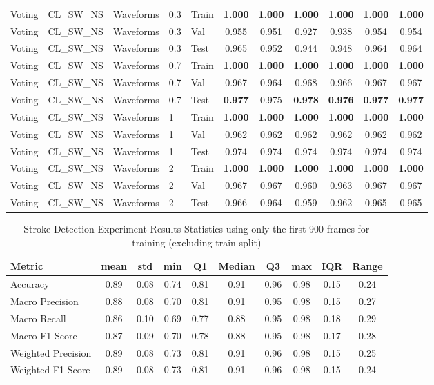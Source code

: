 \begin{landscape}
\begin{longtable}{|l|l|l|l|l|c|c|c|c|c|c|}
Voting & CL\_SW\_NS & Waveforms & 0.3 & Train & \textbf{1.000} & \textbf{1.000} & \textbf{1.000} & \textbf{1.000} & \textbf{1.000} & \textbf{1.000} \\
Voting & CL\_SW\_NS & Waveforms & 0.3 & Val & 0.955 & 0.951 & 0.927 & 0.938 & 0.954 & 0.954 \\
Voting & CL\_SW\_NS & Waveforms & 0.3 & Test & 0.965 & 0.952 & 0.944 & 0.948 & 0.964 & 0.964 \\
Voting & CL\_SW\_NS & Waveforms & 0.7 & Train & \textbf{1.000} & \textbf{1.000} & \textbf{1.000} & \textbf{1.000} & \textbf{1.000} & \textbf{1.000} \\
Voting & CL\_SW\_NS & Waveforms & 0.7 & Val & 0.967 & 0.964 & 0.968 & 0.966 & 0.967 & 0.967 \\
Voting & CL\_SW\_NS & Waveforms & 0.7 & Test & \textbf{0.977} & 0.975 & \textbf{0.978} & \textbf{0.976} & \textbf{0.977} & \textbf{0.977} \\
Voting & CL\_SW\_NS & Waveforms & 1 & Train & \textbf{1.000} & \textbf{1.000} & \textbf{1.000} & \textbf{1.000} & \textbf{1.000} & \textbf{1.000} \\
Voting & CL\_SW\_NS & Waveforms & 1 & Val & 0.962 & 0.962 & 0.962 & 0.962 & 0.962 & 0.962 \\
Voting & CL\_SW\_NS & Waveforms & 1 & Test & 0.974 & 0.974 & 0.974 & 0.974 & 0.974 & 0.974 \\
Voting & CL\_SW\_NS & Waveforms & 2 & Train & \textbf{1.000} & \textbf{1.000} & \textbf{1.000} & \textbf{1.000} & \textbf{1.000} & \textbf{1.000} \\
Voting & CL\_SW\_NS & Waveforms & 2 & Val & 0.967 & 0.967 & 0.960 & 0.963 & 0.967 & 0.967 \\
Voting & CL\_SW\_NS & Waveforms & 2 & Test & 0.966 & 0.964 & 0.959 & 0.962 & 0.965 & 0.965 \\
\end{longtable}
\end{landscape}

\begin{table}[h]
\caption{Stroke Detection Experiment Results Statistics using only the first 900 frames for training (excluding train split)}
\label{tab:_900_Stroke_Detection_Results_Statistics}
\begin{tabular}{|l|c|c|c|c|c|c|c|c|c|}
\toprule
Metric & mean & std & min & Q1 & Median & Q3 & max & IQR & Range \\
\midrule
Accuracy & 0.89 & 0.08 & 0.74 & 0.81 & 0.91 & 0.96 & 0.98 & 0.15 & 0.24 \\
Macro Precision & 0.88 & 0.08 & 0.70 & 0.81 & 0.91 & 0.95 & 0.98 & 0.15 & 0.27 \\
Macro Recall & 0.86 & 0.10 & 0.69 & 0.77 & 0.88 & 0.95 & 0.98 & 0.18 & 0.29 \\
Macro F1-Score & 0.87 & 0.09 & 0.70 & 0.78 & 0.88 & 0.95 & 0.98 & 0.17 & 0.28 \\
Weighted Precision & 0.89 & 0.08 & 0.73 & 0.81 & 0.91 & 0.96 & 0.98 & 0.15 & 0.25 \\
Weighted F1-Score & 0.89 & 0.08 & 0.73 & 0.81 & 0.91 & 0.96 & 0.98 & 0.15 & 0.24 \\
\bottomrule
\end{tabular}
\end{table}
